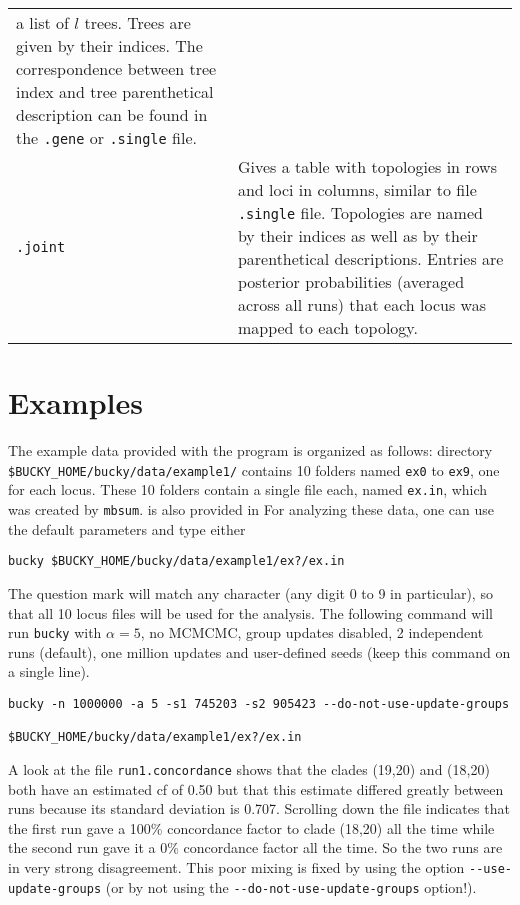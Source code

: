 \documentclass[12pt,english,final,letterpaper]{article}
\begin{document}
\begin{tabular}{l|p{5.1in}}
a list of $l$ trees. Trees are given by their indices. The correspondence
between tree index and tree parenthetical description can be found in the
{\tt .gene} or {\tt .single} file.\\
%
{\tt .joint}&Gives a table with topologies in rows and loci in columns,
similar to file {\tt .single} file. Topologies are 
named by their indices as well as by their parenthetical descriptions. 
Entries are posterior probabilities (averaged across all runs) 
that each locus was mapped to each topology.\\ 
\end{tabular}

\section{Examples}

The example data provided with the program is organized as follows:
directory\\ \verb+$BUCKY_HOME/bucky/data/example1/+ %
contains 10 folders named {\tt ex0} to {\tt ex9}, one for each locus. 
These 10 folders contain a single file each, named {\tt ex.in}, which was 
created by  {\tt mbsum}.
is also provided in For analyzing these data, one
can use the default parameters and type either
\begin{verbatim}
bucky $BUCKY_HOME/bucky/data/example1/ex?/ex.in
\end{verbatim}%
The question mark will match any character (any digit 0 to 9 in
particular), so that all 10 locus files will be used for the analysis.
The following command will run {\tt bucky} with 
$\alpha=5$, no MCMCMC, group updates disabled, 2 independent runs (default), 
one million updates and user-defined seeds (keep this command on a single line).

\begin{verbatim}
bucky -n 1000000 -a 5 -s1 745203 -s2 905423 --do-not-use-update-groups 
                                    $BUCKY_HOME/bucky/data/example1/ex?/ex.in
\end{verbatim}

A look at the file {\tt run1.concordance} shows that the clades (19,20) and
(18,20) both have an estimated {\sc cf} of 0.50 but that this estimate differed
greatly between runs because its standard deviation is 0.707. Scrolling down
the file indicates that the first run gave a 100\% concordance factor to clade
(18,20) all the time while the second run gave it a 0\% concordance factor 
all the time.
So the two runs are in very strong disagreement. 
This poor mixing is fixed by using the option
\verb+--use-update-groups+ (or by not using the 
\verb+--do-not-use-update-groups+ option!).
\medskip
\end{document}
